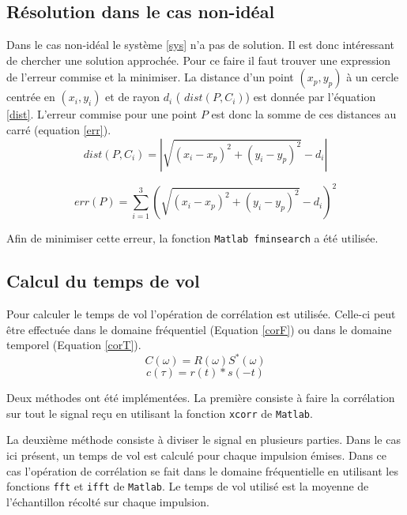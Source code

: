 \documentclass[10pt,a4paper]{article}
\begin{document}
		\subsection{Résolution dans le cas non-idéal}
			Dans le cas non-idéal le système \ref{sys} n'a pas de solution. Il est donc intéressant de chercher une solution approchée. Pour ce faire il faut trouver une expression de l'erreur commise et la minimiser. La distance d'un point $(x_p , y_p)$ à un cercle centrée en $(x_i , y_i)$ et de rayon $d_i$ ( $dist(P , C_i)$) est donnée par l'équation \ref{dist}. L'erreur commise pour une point $P$ est donc la somme de ces distances au carré (equation \ref{err}). 
			\begin{equation}
				dist(P , C_i)= |{\sqrt{(x_i-x_p)^2 +(y_i - y_p)^2} - d_i}| 
				\label{dist}
			\end{equation} 
			
			\begin{equation}
				\label{err}
				err(P) = \sum _{i=1} ^{3} (\sqrt{(x_i-x_p)^2 +(y_i - y_p)^2} - d_i)^2
			\end{equation}
			
			Afin de minimiser cette erreur, la fonction \texttt{Matlab fminsearch} a été utilisée. 
		\subsection{Calcul du temps de vol}
			
			Pour calculer le temps de vol l'opération de corrélation est utilisée. Celle-ci peut être effectuée dans le domaine fréquentiel (Equation \ref{corF}) ou dans le domaine temporel (Equation \ref{corT}). 
			\begin{equation}
				\label{corF}
				C(\omega) = R(\omega)S^*(\omega)
			\end{equation}
			\begin{equation}
				\label{corT}
				c(\tau) = r(t)*s(-t)
			\end{equation}
			
			Deux méthodes ont été implémentées. La première consiste à faire la corrélation sur tout le signal reçu en utilisant la fonction \texttt{xcorr} de \texttt{Matlab}.
			
			 
			La deuxième méthode consiste à diviser le signal en plusieurs parties. Dans le cas ici présent, un temps de vol est calculé pour chaque impulsion émises. Dans ce cas l'opération de corrélation se fait dans le domaine fréquentielle en utilisant les fonctions \texttt{fft} et \texttt{ifft} de \texttt{Matlab}. Le temps de vol utilisé est la moyenne de l'échantillon récolté sur chaque impulsion.
			
						
\end{document}
